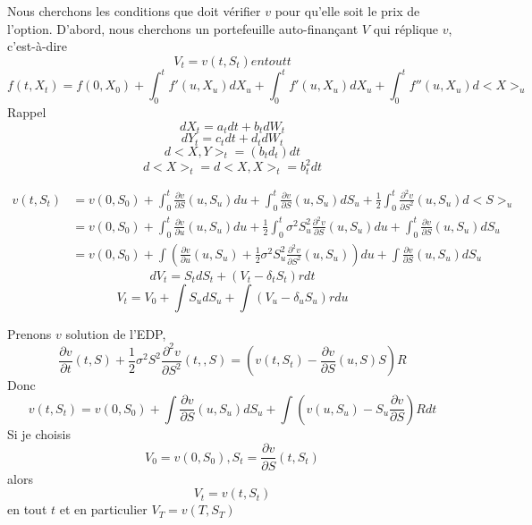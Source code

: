 \documentclass{article}
\begin{document}
Nous cherchons les conditions que doit v\'erifier $v$ pour qu'elle soit le prix de l'option.
D'abord, nous cherchons un portefeuille auto-finan\c{c}ant $V$ qui r\'eplique $v$, c'est-\`a-dire
\begin{equation}
V_t=v(t,S_t)  en tout t
\end{equation}
\begin{equation}
f(t,X_t)=f(0,X_0)+\int_0^tf'(u,X_u)dX_u+\int_0^t f'(u,X_u)dX_u+\int_0^tf''(u,X_u)d<X>_u
\end{equation}
Rappel
\begin{equation}
dX_t=a_tdt+b_tdW_t
\end{equation}
\begin{equation}
dY_t=c_tdt+d_tdW_t
\end{equation}
\begin{equation}
d<X,Y>_t=(b_td_t)dt
\end{equation}
\begin{equation}
d<X>_t=d<X,X>_t=b_t^2dt
\end{equation}

\begin{equation}
\begin{split}
v(t, S_t)&=v(0,S_0)+\int_0^t\frac{\partial v}{\partial S}(u,S_u)du+\int_0^t\frac{\partial v}{\partial S}(u, S_u)
 dS_u + \frac{1}{2}\int_0^t\frac{\partial^2 v}{\partial S^2}(u,S_u)d<S>_u\\
 &=v(0,S_0)+\int_0^t\frac{\partial v}{\partial u}(u,S_u)du+\frac{1}{2}\int_0^t\sigma^2S_u^2\frac{\partial^2 v}{\partial S}(u,S_u)du+\int_0^t\frac{\partial v}{\partial S}(u, S_u)dS_u\\
 &=v(0,S_0)+\int (\frac{\partial v}{\partial u}(u,S_u)+\frac{1}{2}\sigma^2S_u^2\frac{\partial^2 v}{\partial S^2}(u,S_u))du+\int \frac{\partial v}{\partial S}(u, S_u)dS_u
\end{split}
\end{equation}
\begin{equation}
dV_t=S_tdS_t+(V_t-\delta_tS_t)r dt
\end{equation}
\begin{equation}
V_t=V_0+\int S_u dS_u+\int (V_u-\delta_uS_u)rdu
\end{equation}

Prenons $v$ solution de l'EDP,
\begin{equation}
\frac{\partial v}{\partial t}(t,S)+\frac{1}{2}\sigma^2S^2\frac{\partial^2 v}{\partial S^2}(t,,S)=(v(t,S_t)-\frac{\partial v}{\partial S}(u,S)S)R
\end{equation}
Donc 
\begin{equation}
v(t,S_t)=v(0,S_0)+\int\frac{\partial v}{\partial S}(u,S_u) dS_u+\int (v(u,S_u)-S_u\frac{\partial v}{\partial S})Rdt
\end{equation}
Si je choisis
\begin{equation}
V_0=v(0,S_0), S_t=\frac{\partial v}{\partial S}(t,S_t)
\end{equation}
alors
\begin{equation}
V_t=v(t,S_t)
\end{equation}
en tout $t$ et en particulier $V_T=v(T,S_T)$
\end{document}
